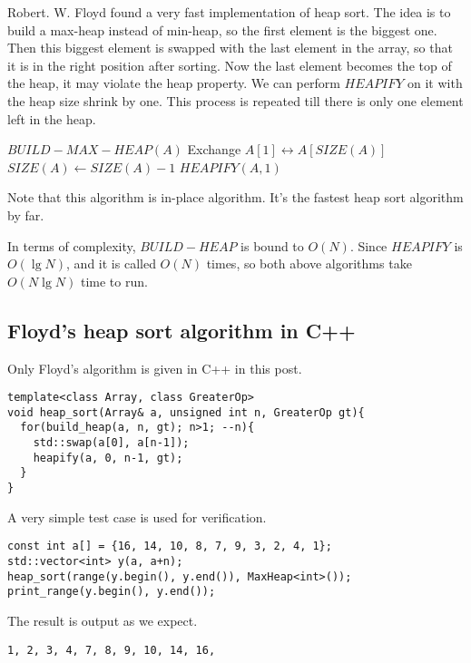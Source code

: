 \documentclass{article}
\begin{document}
Robert. W. Floyd found a very fast implementation of heap sort.
The idea is to build a max-heap instead of min-heap, so the first
element is the biggest one. Then this biggest element is swapped
with the last element in the array, so that it is in the right
position after sorting. Now the last element becomes the top
of the heap, it may violate the heap property. We can perform
$HEAPIFY$ on it with the heap size shrink by one. This process
is repeated till there is only one element left in the heap.

\begin{algorithmic}[1]
  \State $BUILD-MAX-HEAP(A)$
    \State Exchange $A[1] \leftrightarrow A[SIZE(A)]$
    \State $SIZE(A) \gets SIZE(A) - 1$
    \State $HEAPIFY(A, 1)$
  \EndWhile
\EndFunction
\end{algorithmic}

Note that this algorithm is in-place algorithm. It's the
fastest heap sort algorithm by far.

In terms of complexity, $BUILD-HEAP$ is bound to $O(N)$.
Since $HEAPIFY$ is $O(\lg{N})$, and it
is called $O(N)$ times, so both above algorithms take $O(N \lg{N})$
time to run.

\subsection*{Floyd's heap sort algorithm in C++}

Only Floyd's algorithm is given in C++ in this post.

\lstset{language=C++}
\begin{lstlisting}
template<class Array, class GreaterOp>
void heap_sort(Array& a, unsigned int n, GreaterOp gt){
  for(build_heap(a, n, gt); n>1; --n){
    std::swap(a[0], a[n-1]);
    heapify(a, 0, n-1, gt);
  }
}
\end{lstlisting}

A very simple test case is used for verification.

\begin{lstlisting}
const int a[] = {16, 14, 10, 8, 7, 9, 3, 2, 4, 1};
std::vector<int> y(a, a+n);
heap_sort(range(y.begin(), y.end()), MaxHeap<int>());
print_range(y.begin(), y.end());
\end{lstlisting}

The result is output as we expect.

\begin{verbatim}
1, 2, 3, 4, 7, 8, 9, 10, 14, 16,
\end{verbatim}
\end{document}
